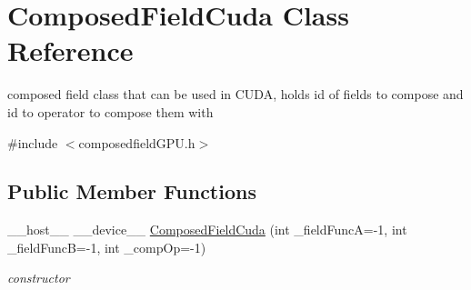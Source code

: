 \hypertarget{classComposedFieldCuda}{}\section{Composed\+Field\+Cuda Class Reference}
\label{classComposedFieldCuda}


composed field class that can be used in C\+U\+DA, holds id of fields to compose and id to operator to compose them with  




{\ttfamily \#include $<$composedfield\+G\+P\+U.\+h$>$}

\subsection*{Public Member Functions}
\begin{DoxyCompactItemize}
\item 
\+\_\+\+\_\+host\+\_\+\+\_\+ \+\_\+\+\_\+device\+\_\+\+\_\+ \hyperlink{classComposedFieldCuda_aeb1477c754308d2a599e0cc0feead61c}{Composed\+Field\+Cuda} (int \+\_\+field\+FuncA=-\/1, int \+\_\+field\+FuncB=-\/1, int \+\_\+comp\+Op=-\/1)\hypertarget{classComposedFieldCuda_aeb1477c754308d2a599e0cc0feead61c}{}\label{classComposedFieldCuda_aeb1477c754308d2a599e0cc0feead61c}

\begin{DoxyCompactList}\small\item\em constructor \end{DoxyCompactList}\end{DoxyCompactItemize}
